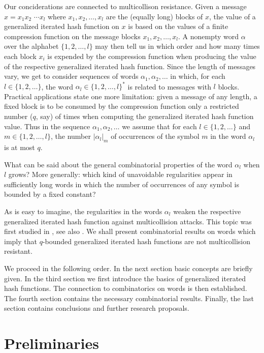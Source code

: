 \documentclass[submission,copyright,creativecommons]{eptcs}
\begin{document}
Our conciderations are connected to multicollison resistance. Given a message $x=x_1x_2$ $\cdots x_l$ where $x_1,x_2,\ldots,x_l$ are the (equally long) blocks of $x$, the value of a generalized iterated hash function on $x$ is based on the values of a finite compression function on the message blocks $x_1,x_2,\ldots,x_l$. A nonempty word $\alpha$ over the alphabet $\{1,2,\ldots,l\}$ may then tell us in which order and how many times each block $x_i$ is expended by the compression function when producing the value of the respective generalized iterated hash function. Since the length of messages vary, we get to consider sequences of words $\alpha_1,\alpha_2,\ldots$ in which, for each $l\in\{1,2,\ldots\}$, the word $\alpha_l\in\{1,2,\ldots,l\}^\ast$ is related to messages with $l$ blocks. Practical applications state one more limitation: given a message of any length, a fixed   block is to be consumed by the compression function only a restricted number ($q$, say) of times when computing the generalized iterated hash function value. Thus in the sequence $\alpha_1,\alpha_2,\ldots$ we assume that for each $l\in\{1,2,\ldots\}$ and $m\in\{1,2,\ldots,l\}$, the number $|\alpha_l|_m$ of occurrences of the symbol $m$ in the word $\alpha_l$ is at most $q$. 

What can be said about the general combinatorial properties of the word $\alpha_l$ when $l$ grows? More generally: which kind of unavoidable regularities appear in sufficiently long words in which the number of occurrences of any symbol is bounded by a fixed constant? 

As is easy to imagine, the regularities in the words $\alpha_l$ weaken the respective generalized iterated hash function against multicollision attacks. This topic was first studied in \cite{HoS}, see also \cite{Jou,NaS,HKK,KHK,KKH,KKV}. We shall present combinatorial results on words which imply that $q$-bounded generalized iterated hash functions are not multicollision resistant.  

We proceed in the following order. In the next section basic concepts are briefly given. In the third section we first introduce the basics of generalized iterated hash functions. The connection to combinatorics on words is then established. The fourth section contains the necessary combinatorial results. Finally, the last section contains conclusions and further research proposals.


\section{Preliminaries}
\end{document}
